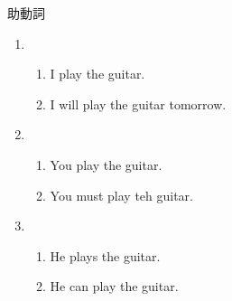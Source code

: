 \documentclass[aspectratio=169,xcolor={dvipsnames,table}]{beamer}
\begin{document}
\begin{frame}[plain]{助動詞}
 \Large

\begin{enumerate}
 \item \begin{enumerate}
	\item I play the guitar.
	\item I will play the guitar tomorrow.
       \end{enumerate}
 \item \begin{enumerate}
	\item You play the guitar.
	\item You must play teh guitar.
       \end{enumerate}
 \item \begin{enumerate}
	\item He plays the guitar.
	\item He can play the guitar.
       \end{enumerate}
\end{enumerate}
\end{frame}
\end{document}
